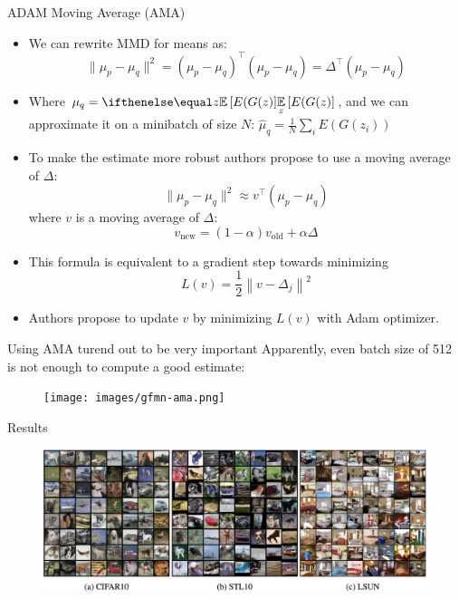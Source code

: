 \documentclass[handout, 10pt]{beamer}
\begin{document}
\begin{frame}{ADAM Moving Average (AMA)}
\begin{itemize}
    \item\pause We can rewrite MMD for means as:
    \[
    \|\mu_p - \mu_q\|^2 = (\mu_p - \mu_q)^\top (\mu_p - \mu_q) = \Delta^\top (\mu_p - \mu_q)
    \]
    \item\pause Where $\mu_q = \expect[z]{E(G(z)}$, and we can approximate it on a minibatch of size $N$: $\hat\mu_q = \frac{1}{N}\sum_i E(G(z_i))$
    \item\pause To make the estimate more robust authors propose to use a moving average of $\Delta$:
    \[
    \|\mu_p - \mu_q\|^2 \approx v^\top (\mu_p - \mu_q)
    \]
    where $v$ is a moving average of $\Delta$:
    \[
    v_\text{new} = (1 - \alpha) v_\text{old} + \alpha \Delta
    \]
    \item\pause This formula is equivalent to a gradient step towards minimizing
    \[
L(v) = \frac{1}{2}\left\|v-\Delta_{j}\right\|^{2}
    \]
    \item\pause Authors propose to update $v$ by minimizing $L(v)$ with Adam optimizer.
\end{itemize}
\end{frame}

\begin{frame}{Using AMA turend out to be very important}
Apparently, even batch size of 512 is not enough to compute a good estimate:
\begin{figure}
\centering
\texttt{[image: images/gfmn-ama.png]}
\end{figure}
\end{frame}

\begin{frame}{Results}
\begin{figure}
\centering
\includegraphics[width=\textwidth]{images/gfmn-samples.png}
\end{figure}
\end{frame}
\end{document}
